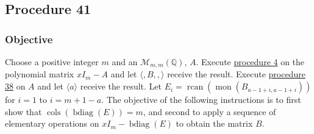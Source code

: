 \documentclass[twocolumn]{article}
\DeclareMathOperator{\bdiag}{bdiag}
\DeclareMathOperator{\rcan}{rcan}
\DeclareMathOperator{\mon}{mon}
\DeclareMathOperator{\cols}{cols}
\begin{document}
		\subsection{Procedure 41}\label{sec:procedure 41}
			\subsubsection{Objective}
				Choose a positive integer $m$ and an $\mathcal{M}_{m,m}(\mathbb{Q})$, $A$. Execute \hyperref[sec:procedure 4]{procedure 4} on the polynomial matrix $xI_m-A$ and let $\langle,B,,\rangle$ receive the result. Execute \hyperref[sec:procedure 38]{procedure 38} on $A$ and let $\langle a\rangle$ receive the result. Let $E_i=\rcan(\mon(B_{a-1+i,a-1+i}))$ for $i=1$ to $i=m+1-a$. The objective of the following instructions is to first show that $\cols(\bdiag(E))=m$, and second to apply a sequence of elementary operations on $xI_m-\bdiag(E)$ to obtain the matrix $B$.
\end{document}
